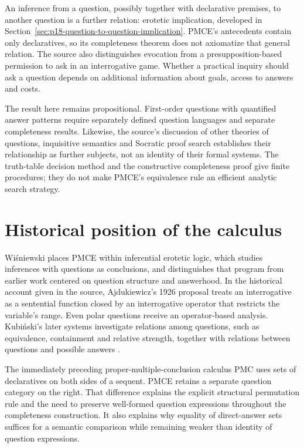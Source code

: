 An inference from a question, possibly together with declarative premises,
to another question is a further relation: erotetic implication, developed
in Section~\ref{sec:p18-question-to-question-implication}. PMCE's
antecedents contain only declaratives, so its completeness theorem does
not axiomatize that general relation. The source also distinguishes
evocation from a presupposition-based permission to ask in an interrogative
game. Whether a practical inquiry should ask a question depends on
additional information about goals, access to answers and costs.

The result here remains propositional. First-order questions with
quantified answer patterns require separately defined question languages
and separate completeness results. Likewise, the source's discussion of
other theories of questions, inquisitive semantics and Socratic proof
search establishes their relationship as further subjects, not an
identity of their formal systems. The truth-table decision method and
the constructive completeness proof give finite procedures; they do
not make PMCE's equivalence rule an efficient analytic search strategy.

\section{Historical position of the calculus}

Wi\'sniewski places PMCE within inferential erotetic logic, which studies
inferences with questions as conclusions, and distinguishes that program
from earlier work centered on question structure and answerhood.
In the historical account given in the source, Ajdukiewicz's 1926
proposal treats an interrogative as a sentential function closed by
an interrogative operator that restricts the variable's range. Even
polar questions receive an operator-based analysis. Kubi\'nski's later
systems investigate relations among questions, such as equivalence,
containment and relative strength, together with relations between
questions and possible answers \cite[sec.~1.3]{Wisniewski2016QuestionEvocation}.

The immediately preceding proper-multiple-conclusion calculus PMC uses
sets of declaratives on both sides of a sequent. PMCE retains a separate
question category on the right. That difference explains the explicit
structural permutation rule and the need to preserve well-formed
question expressions throughout the completeness construction. It also
explains why equality of direct-answer sets suffices for a semantic
comparison while remaining weaker than identity of question expressions.
